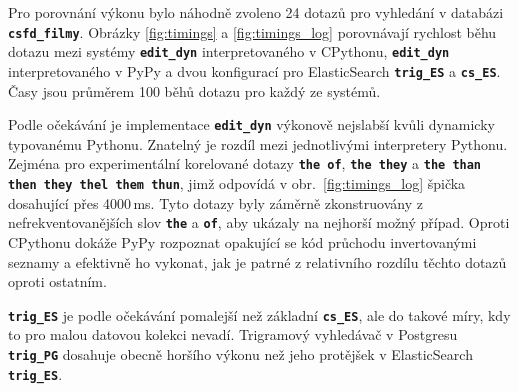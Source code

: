 \documentclass[11pt,letterpaper,oneside,openright]{book}
\newcommand{\bftt}[1]{\texttt{\textbf{#1}}}
\begin{document}
Pro porovnání výkonu bylo náhodně zvoleno 24 dotazů pro vyhledání v databázi
\bftt{csfd\_filmy}. Obrázky \ref{fig:timings} a \ref{fig:timings_log}
porovnávají rychlost běhu dotazu mezi systémy \bftt{edit\_dyn} interpretovaného
v CPythonu, \bftt{edit\_dyn} interpretovaného v PyPy a dvou konfigurací pro
ElasticSearch \bftt{trig\_ES} a \bftt{cs\_ES}.  Časy jsou průměrem 100 běhů
dotazu pro každý ze systémů.

Podle očekávání je implementace \bftt{edit\_dyn} výkonově nejslabší kvůli
dynamicky typovanému Pythonu. Znatelný je rozdíl mezi jednotlivými interpretery
Pythonu. Zejména pro experimentální korelované dotazy \bftt{the of}, \bftt{the
they} a \bftt{the than then they thel them thun}, jimž odpovídá v
obr.~\ref{fig:timings_log} špička dosahující přes 4000\,ms. Tyto dotazy byly
záměrně zkonstruovány z nefrekventovanějších slov \bftt{the} a \bftt{of}, aby
ukázaly na nejhorší možný případ. Oproti CPythonu dokáže PyPy rozpoznat
opakující se kód průchodu invertovanými seznamy a efektivně ho vykonat, jak je
patrné z relativního rozdílu těchto dotazů oproti ostatním.

\bftt{trig\_ES} je podle očekávání pomalejší než základní \bftt{cs\_ES}, ale do
takové míry, kdy to pro malou datovou kolekci nevadí. Trigramový vyhledávač v
Postgresu \bftt{trig\_PG} dosahuje obecně horšího výkonu než jeho protějšek v
ElasticSearch \bftt{trig\_ES}.
\end{document}
